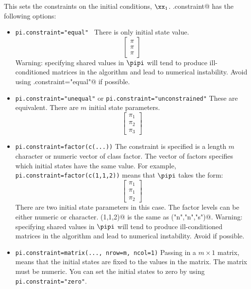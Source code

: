 This sets the constraints on the initial conditions, $\xx_1$.  \verb@pi.constraint@ has the following options:
\begin{itemize}\itemsep5pt
\item[] \texttt{pi.constraint="equal" } There is only initial state value.
\begin{equation*}
 \left[ \begin{array}{c}
    \pi \\
    \pi \\
    \pi \end{array} \right]
\end{equation*}
Warning: specifying shared values in $\pipi$ will tend to produce ill-conditioned matrices in the algorithm and lead to numerical instability.  Avoid using \verb@pi.constraint="equal"@ if possible.

\item[] \texttt{pi.constraint="unequal"} or \texttt{pi.constraint="unconstrained"} These are equivalent.  There are $m$ initial state parameters.  
\begin{equation*}
 \left[ \begin{array}{c}
    \pi_1\\
    \pi_2\\
    \pi_3 \end{array} \right]
\end{equation*}

\item[] \texttt{pi.constraint=factor(c(...))} The constraint is specified is a length $m$ character or numeric vector of class factor.  The vector of factors specifies which initial states have the same value.  For example, \texttt{pi.constraint=factor(c(1,1,2))} means that $\pipi$ takes the form:
\begin{equation*}
 \left[ \begin{array}{c}
    \pi_1 \\
    \pi_1 \\
    \pi_2 \end{array} \right]
\end{equation*}
There are two initial state parameters in this case.  The factor levels can be either numeric or character.  \verb@c(1,1,2)@ is the same as \verb@c("n","n","s")@.
Warning: specifying shared values in $\pipi$ will tend to produce ill-conditioned matrices in the algorithm and lead to numerical instability.  Avoid if possible.

\item[] \texttt{pi.constraint=matrix(..., nrow=m, ncol=1)}  Passing in a $m \times 1$ matrix, means that the initial states are fixed to the values in the matrix. The matrix must be numeric.  You can set the initial states to zero by using \texttt{pi.constraint="zero"}. 


\end{itemize}
